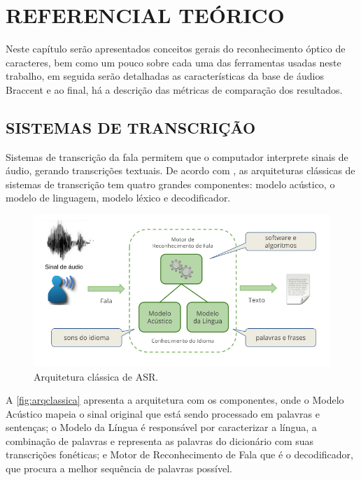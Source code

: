 \chapter[REFERENCIAL TEÓRICO]{REFERENCIAL TEÓRICO}

Neste capítulo serão apresentados conceitos gerais do reconhecimento óptico de caracteres, bem como um pouco sobre cada uma das ferramentas usadas neste trabalho, em seguida serão detalhadas as características da base de áudios Braccent e ao final, há a descrição das métricas de comparação dos resultados.


\section{SISTEMAS DE TRANSCRIÇÃO}

Sistemas de transcrição da fala permitem que o computador interprete sinais de áudio, gerando transcrições textuais. 
De acordo com , as arquiteturas clássicas de sistemas de transcrição tem quatro grandes componentes: modelo acústico, o modelo de linguagem, modelo léxico e decodificador. 

\begin{figure}[h!]
\centering
\caption{Arquitetura clássica de ASR.}
\label{fig:arqclassica}
\includegraphics[width=130mm]{images/asr_2.png}
\end{figure}

A \autoref{fig:arqclassica} apresenta a arquitetura com os componentes, onde o Modelo Acústico mapeia o sinal original que está sendo processado em palavras e sentenças; o Modelo da Língua é responsável por caracterizar a língua, a combinação de palavras e representa as palavras do dicionário com suas transcrições fonéticas; e Motor de Reconhecimento de Fala que é o  decodificador, que procura a melhor sequência de palavras possível. 



